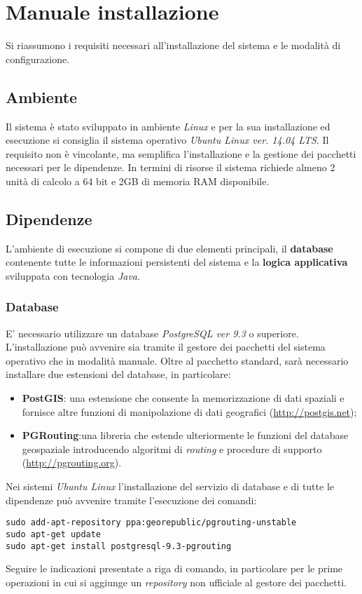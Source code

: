 \chapter{Manuale installazione}
Si riassumono i requisiti necessari all'installazione del sistema e le modalità di configurazione.

\section{Ambiente}
Il sistema è stato sviluppato in ambiente \emph{Linux} e per la sua installazione ed esecuzione si consiglia il sistema operativo \emph{Ubuntu Linux ver. 14.04 LTS}. Il requisito non è vincolante, ma semplifica l'installazione e la gestione dei pacchetti necessari per le dipendenze. In termini di risorse il sistema richiede almeno 2 unità di calcolo a 64 bit e 2GB di memoria RAM disponibile.

\section{Dipendenze}
L'ambiente di esecuzione si compone di due elementi principali, il \textbf{database} contenente tutte le informazioni persistenti del sistema e la \textbf{logica applicativa} sviluppata con tecnologia \emph{Java}.

\subsection{Database}
E' necessario utilizzare un database \emph{PostgreSQL ver 9.3} o superiore. L'installazione può avvenire sia tramite il gestore dei pacchetti del sistema operativo che in modalità manuale. Oltre al pacchetto standard, sarà necessario installare due estensioni del database, in particolare:
\begin{itemize}
\item \textbf{PostGIS}: una estensione che consente la memorizzazione di dati spaziali e fornisce altre funzioni di manipolazione di dati geografici (\url{http://postgis.net});
\item \textbf{PGRouting}:una libreria che estende ulteriormente le funzioni del database geospaziale introducendo algoritmi di \emph{routing} e procedure di supporto (\url{http://pgrouting.org}).
\end{itemize}
Nei sistemi \emph{Ubuntu Linux} l'installazione del servizio di database e di tutte le dipendenze può avvenire tramite l'esecuzione dei comandi:
\begin{verbatim}
sudo add-apt-repository ppa:georepublic/pgrouting-unstable
sudo apt-get update
sudo apt-get install postgresql-9.3-pgrouting
\end{verbatim}
Seguire le indicazioni presentate a riga di comando, in particolare per le prime operazioni in cui si aggiunge un \emph{repository} non ufficiale al gestore dei pacchetti.

